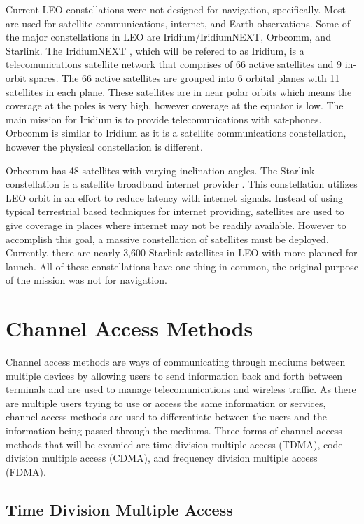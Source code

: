 \documentclass[12pt]{report}
\begin{document}
Current LEO constellations were not designed for navigation, specifically. Most are used for satellite communications, internet, and Earth observations. Some of the major constellations in LEO are Iridium/IridiumNEXT, Orbcomm, and Starlink. The IridiumNEXT \cite{IridiumNEXTReview2019}, which will be refered to as Iridium, is a telecomunications satellite network that comprises of 66 active satellites and 9 in-orbit spares. The 66 active satellites are grouped into 6 orbital planes with 11 satellites in each plane. These satellites are in near polar orbits which means the coverage at the poles is very high, however coverage at the equator is low. The main mission for Iridium is to provide telecomunications with sat-phones. Orbcomm is similar to Iridium as it is a satellite communications constellation, however the physical constellation is different. 

Orbcomm has 48 satellites with varying inclination angles. The Starlink constellation is a satellite broadband internet provider \cite{Starlink}. This constellation utilizes LEO orbit in an effort to reduce latency with internet signals. Instead of using typical terrestrial based techniques for internet providing, satellites are used to give coverage in places where internet may not be readily available. However to accomplish this goal, a massive constellation of satellites must be deployed. Currently, there are nearly 3,600 Starlink satellites in LEO with more planned for launch. All of these constellations have one thing in common, the original purpose of the mission was not for navigation. 

\section{Channel Access Methods}

Channel access methods are ways of communicating through mediums between multiple devices by allowing users to send information back and forth between terminals and are used to manage telecomunications and wireless traffic. As there are multiple users trying to use or access the same information or services, channel access methods are used to differentiate between the users and the information being passed through the mediums. Three forms of channel access methods that will be examied are time division multiple access (TDMA), code division multiple access (CDMA), and frequency division multiple access (FDMA). 

\subsection{Time Division Multiple Access}\label{sec:TDMAsection}
\end{document}
